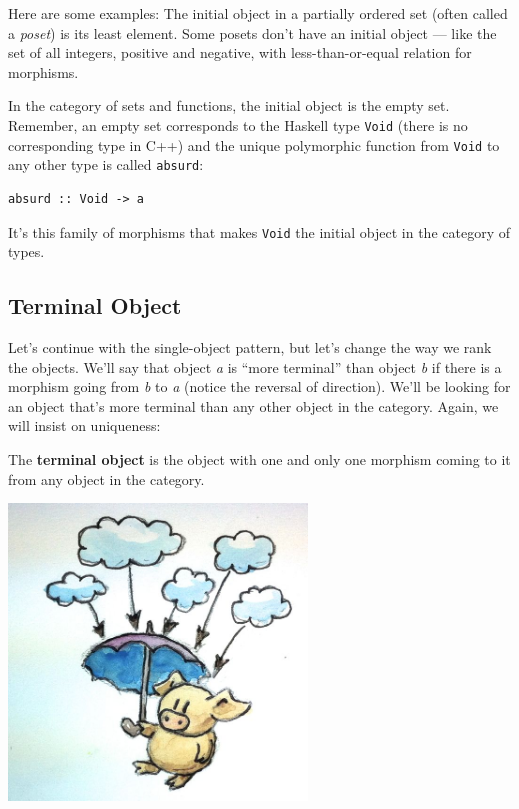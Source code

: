 Here are some examples: The initial object in a partially ordered set
(often called a \emph{poset}) is its least element. Some posets don't
have an initial object --- like the set of all integers, positive and
negative, with less-than-or-equal relation for morphisms.

In the category of sets and functions, the initial object is the empty
set. Remember, an empty set corresponds to the Haskell type
\texttt{Void} (there is no corresponding type in C++) and the unique
polymorphic function from \texttt{Void} to any other type is called
\texttt{absurd}:

\begin{verbatim}
absurd :: Void -> a
\end{verbatim}

It's this family of morphisms that makes \texttt{Void} the initial
object in the category of types.

\subsection{Terminal Object}\label{terminal-object}

Let's continue with the single-object pattern, but let's change the way
we rank the objects. We'll say that object \emph{a} is ``more terminal''
than object \emph{b} if there is a morphism going from \emph{b} to
\emph{a} (notice the reversal of direction). We'll be looking for an
object that's more terminal than any other object in the category.
Again, we will insist on uniqueness:

The \textbf{terminal object} is the object with one and only one
morphism coming to it from any object in the category.

\includegraphics[width=3.12500in]{images/final.jpg}

